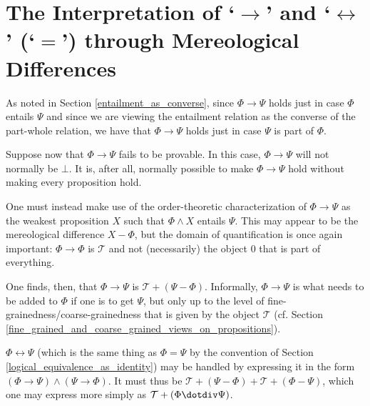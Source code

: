 \documentclass[12pt]{book}
\begin{document}
\section{The Interpretation of `$\rightarrow$' and `$\leftrightarrow$' (`$=$') through Mereological Differences} \label{interpretation_of_implications}
As noted in Section \ref{entailment_as_converse}, since $\Phi \rightarrow \Psi$ holds just in case $\Phi$ entails $\Psi$ and since we are viewing the entailment relation as the converse of the part-whole relation, we have that $\Phi \rightarrow \Psi$ holds just in case $\Psi$ is part of $\Phi$.%

Suppose now that $\Phi \rightarrow \Psi$ fails to be provable. In this case, $\Phi \rightarrow \Psi$ will not normally be $\bot$. It is, after all, normally possible to make $\Phi \rightarrow \Psi$ hold without making every proposition hold.

One must instead make use of the order-theoretic characterization of $\Phi \rightarrow \Psi$ as the weakest proposition $X$ such that $\Phi \wedge X$ entails $\Psi$. This may appear to be the mereological difference $X - \Phi$, but the domain of quantification is once again important: $\Phi \rightarrow \Phi$ is $\mathcal{T}$ and not (necessarily) the object 0 that is part of everything.

One finds, then, that $\Phi \rightarrow \Psi$ is $\mathcal{T} + (\Psi - \Phi)$. Informally, $\Phi \rightarrow \Psi$ is what needs to be added to $\Phi$ if one is to get $\Psi$, but only up to the level of fine-grainedness/coarse-grainedness that is given by the object $\mathcal{T}$ (cf. Section \ref{fine_grained_and_coarse_grained_views_on_propositions}). 

$\Phi \leftrightarrow \Psi$ (which is the same thing as $\Phi = \Psi$ by the convention of Section \ref{logical_equivalence_as_identity}) may be handled by expressing it in the form $(\Phi \rightarrow \Psi) \wedge (\Psi \rightarrow \Phi)$. It must thus be $\mathcal{T} + (\Psi - \Phi) + \mathcal{T} + (\Phi - \Psi)$, which one may express more simply as $\mathcal{T} + (\Phi \dotdiv \Psi)$.
\end{document}
